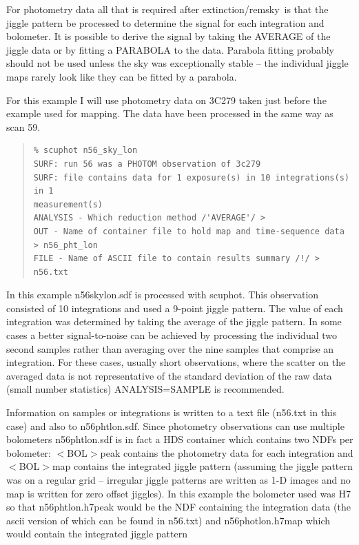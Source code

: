 \documentclass[twoside,11pt]{article}
\newcommand{\task}[1]{{\sf #1}}
\newcommand{\scuphot}{\htmlref{\task{scuphot}}{SCUPHOT}}
\newcommand{\ext}{\htmlref{\task{extinction}}{EXTINCTION}}
\newcommand{\remsky}{\htmlref{\task{remsky}}{REMSKY}}
\newenvironment{myquote}{\begin{quote}\begin{small}}{\end{small}\end{quote}}
\newcommand{\htmlref}[2]{#1}
\renewcommand{\_}{\texttt{\symbol{95}}}
\begin{document}
For photometry data all that is required after \ext/\remsky\ is that the
jiggle pattern be processed to determine the signal for each integration and
bolometer. It is possible to derive the signal by taking the AVERAGE of the
jiggle data or by fitting a PARABOLA to the data. Parabola fitting probably
should not be used unless the sky was exceptionally stable -- the individual
jiggle maps rarely look like they can be fitted by a parabola.

For this example I will use photometry data on 3C279 taken just before
the example used for mapping. The data have been processed in the same 
way as scan 59.

\begin{myquote}
\begin{verbatim}
% scuphot n56_sky_lon
SURF: run 56 was a PHOTOM observation of 3c279
SURF: file contains data for 1 exposure(s) in 10 integrations(s) in 1
measurement(s)
ANALYSIS - Which reduction method /'AVERAGE'/ > 
OUT - Name of container file to hold map and time-sequence data > n56_pht_lon 
FILE - Name of ASCII file to contain results summary /!/ > n56.txt
\end{verbatim}
\end{myquote}

In this example n56\_sky\_lon.sdf is processed with \scuphot.  This
observation consisted of 10 integrations and used a 9-point jiggle pattern.
The value of each integration was determined by taking the average of the
jiggle pattern. In some cases a better signal-to-noise can be achieved
by processing the individual two second samples rather than averaging
over the nine samples that comprise an integration. For these cases, usually
short observations, where the scatter on the averaged data is not
representative of the standard deviation of the raw data (small number
statistics) ANALYSIS=SAMPLE is recommended.

Information on samples or integrations is written to a text file (n56.txt in
this case) and also to n56\_pht\_lon.sdf. Since photometry observations can
use multiple bolometers n56\_pht\_lon.sdf is in fact a HDS container
\cite{hds} which contains two NDFs per bolometer: $<$BOL$>$\_peak contains the
photometry data for each integration and $<$BOL$>$\_map contains the
integrated jiggle pattern (assuming the jiggle pattern was on a regular grid
-- irregular jiggle patterns are written as 1-D images and no map is written
for zero offset jiggles).  In this example the bolometer used was H7 so that
n56\_pht\_lon.h7\_peak would be the NDF containing the integration data (the
ascii version of which can be found in n56.txt) and n56\_phot\_lon.h7\_map
which would contain the integrated jiggle pattern
\end{document}
